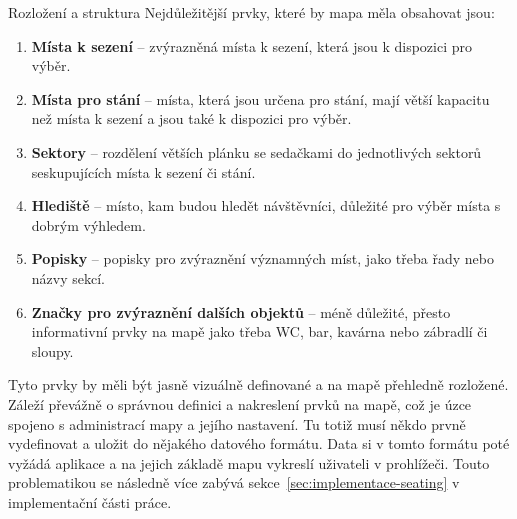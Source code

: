 \begin{subsection}{Rozložení a struktura}
    Nejdůležitější prvky, které by mapa měla obsahovat jsou:
    \begin{enumerate}
        \item \textbf{Místa k sezení} – zvýrazněná místa k sezení, která jsou k dispozici pro výběr.
        \item \textbf{Místa pro stání} – místa, která jsou určena pro stání, mají větší kapacitu než místa k sezení a jsou také k dispozici pro výběr.
        \item \textbf{Sektory} – rozdělení větších plánku se sedačkami do jednotlivých sektorů seskupujících místa k sezení či stání.
        \item \textbf{Hlediště} – místo, kam budou hledět návštěvníci, důležité pro výběr místa s dobrým výhledem.
        \item \textbf{Popisky} – popisky pro zvýraznění významných míst, jako třeba řady nebo názvy sekcí.
        \item \textbf{Značky pro zvýraznění dalších objektů} – méně důležité, přesto informativní prvky na mapě jako třeba WC, bar, kavárna nebo zábradlí či sloupy.
    \end{enumerate}

    Tyto prvky by měli být jasně vizuálně definované a na mapě přehledně rozložené.
    Záleží převážně o správnou definici a nakreslení prvků na mapě, což je úzce spojeno s administrací mapy a jejího nastavení.
    Tu totiž musí někdo prvně vydefinovat a uložit do nějakého datového formátu.
    Data si v tomto formátu poté vyžádá aplikace a na jejich základě mapu vykreslí uživateli v prohlížeči.
    Touto problematikou se následně více zabývá sekce~\ref{sec:implementace-seating} v implementační části práce.
\end{subsection}

